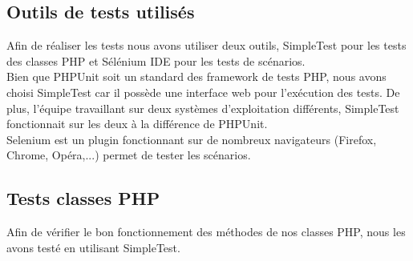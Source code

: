 \documentclass{sigplanconf}
\begin{document}
\subsection{Outils de tests utilisés}
Afin de réaliser les tests nous avons utiliser deux outils, SimpleTest pour les tests des classes PHP et Sélénium IDE pour les tests de scénarios.\\
Bien que PHPUnit soit un standard des framework de tests PHP, nous avons choisi SimpleTest car il possède une interface web pour l’exécution des tests. De plus, l’équipe travaillant sur deux systèmes d’exploitation différents, SimpleTest fonctionnait sur les deux à la différence de PHPUnit.\\
Selenium est un plugin fonctionnant sur de nombreux navigateurs (Firefox, Chrome, Opéra,...) permet de tester les scénarios.

\subsection{Tests classes PHP} %
Afin de vérifier le bon fonctionnement des méthodes de nos classes PHP, nous les avons testé en utilisant SimpleTest.
\end{document}
